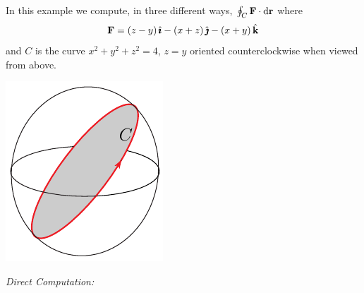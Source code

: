 \begin{eg}\label{eg:stokesLong}

In this example we compute, in three different ways, 
$\oint_C\mathbf{F}\cdot \mathrm{d}\mathbf{r}$ where 
\begin{equation*}
\mathbf{F}=(z-y)\,\hat{\pmb{\imath}}-(x+z)\,\hat{\pmb{\jmath}}-(x+y)\,\hat{\mathbf{k}}
\end{equation*}
and $C$ is the curve $x^2+y^2+z^2=4$, $z=y$
oriented counterclockwise when viewed from above. 
\begin{nfig}
\begin{center}
    \includegraphics{circle4bb.pdf}
\end{center}
\end{nfig}



\medskip
\noindent
\emph{Direct Computation:}


\end{eg}
